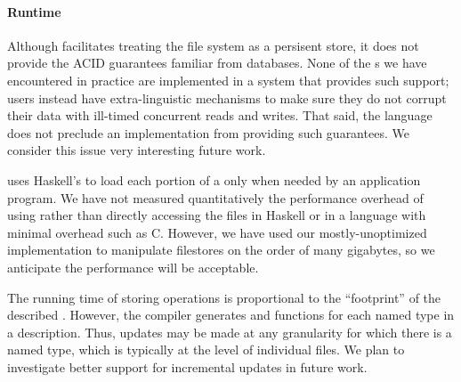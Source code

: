 \paragraph{Runtime}
Although \forest{} facilitates treating the file system as a
persisent store, it does not provide the ACID guarantees familiar from
databases.  None of the \filestore{}s we
have encountered in practice are implemented in a system that provides
such support; users instead have extra-linguistic mechanisms to make
sure they do not corrupt their data with ill-timed concurrent reads
and writes. That said, the \forest{} language does not preclude an
implementation from providing such guarantees. We consider this issue
very interesting future work. 

\forest{} uses Haskell's  to load each portion
of a \filestore{} only when needed by an application program.
We have not measured quantitatively the performance overhead of using
\forest{} rather than directly accessing the files in Haskell or in a
language with minimal overhead such as C. However, we have used our
mostly-unoptimized implementation to manipulate filestores on the
order of many gigabytes, so we anticipate the performance will be acceptable.  

The running time of storing operations is proportional to the
``footprint'' of the described \filestore{}. However, the \forest{}
compiler generates  and  functions for each
named type in a description. Thus, updates may be made at any
granularity for which there is a named type, which is typically at the
level of individual files. We plan to investigate better support for
incremental updates in future work.



